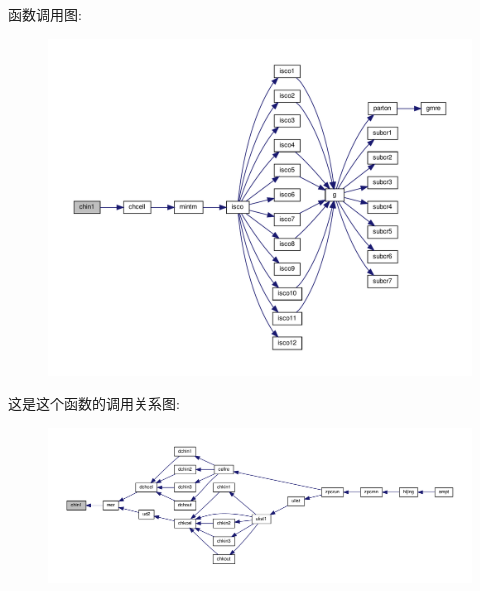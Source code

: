 函数调用图\+:
\nopagebreak
\begin{figure}[H]
\begin{center}
\leavevmode
\includegraphics[width=350pt]{chin1_8f90_a380da5f30a76dc0d2af11b225bc929bd_cgraph}
\end{center}
\end{figure}
这是这个函数的调用关系图\+:
\nopagebreak
\begin{figure}[H]
\begin{center}
\leavevmode
\includegraphics[width=350pt]{chin1_8f90_a380da5f30a76dc0d2af11b225bc929bd_icgraph}
\end{center}
\end{figure}
